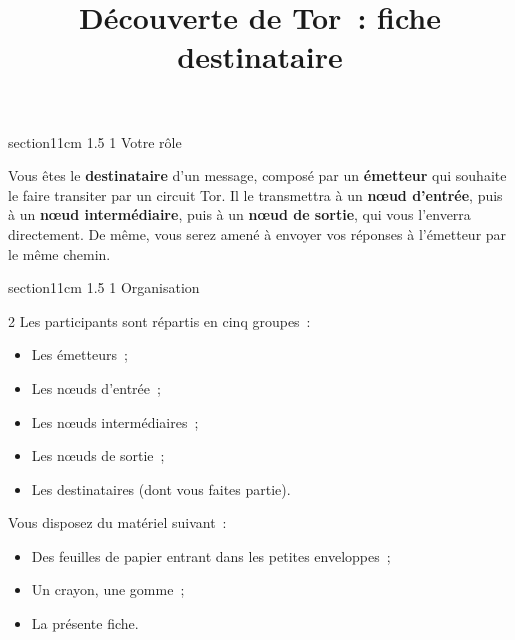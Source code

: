 \documentclass[a4paper,twoside,french]{article}
\makeatletter
\renewcommand\section{\@startsection
  {section}{1}{1cm}%
  {1.5\baselineskip}%
  {1\baselineskip}%
  {\normalfont\Large\bfseries}}%
\makeatother
\begin{document}
  
  \title{Découverte de Tor~: fiche \og destinataire\fg}
  \date{}

  \maketitle
  \pagestyle{empty}
  \thispagestyle{empty}

  \section{Votre rôle}

  Vous êtes le \textbf{destinataire} d'un message, composé par un
  \textbf{émetteur} qui souhaite le faire transiter par un circuit
  Tor. Il le transmettra à un \textbf{n\oe ud d'entrée}, puis à un
  \textbf{n\oe ud intermédiaire}, puis à un \textbf{n\oe ud de
    sortie}, qui vous l'enverra directement. De même, vous serez amené
  à envoyer vos réponses à l'émetteur par le même chemin.
  
  \section{Organisation}

  \begin{multicols}{2}
    Les participants sont répartis en cinq groupes~:
    \begin{itemize}
    \item Les émetteurs~;
    \item Les n\oe uds d'entrée~;
    \item Les n\oe uds intermédiaires~;
    \item Les n\oe uds de sortie~;
    \item Les destinataires (dont vous faites partie).
    \end{itemize}
    \vfill\columnbreak

    Vous disposez du matériel suivant~:
    \begin{itemize}
    \item Des feuilles de papier entrant dans les petites enveloppes~;
    \item Un crayon, une gomme~;
    \item La présente fiche.
    \end{itemize}
  \end{multicols}
\end{document}
